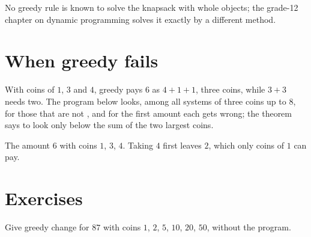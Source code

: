 No greedy rule is known to solve the knapsack with whole objects; the grade-12 chapter on dynamic programming solves it
exactly by a different method.

\section{When greedy fails}\label{sec:g11:greedy-algorithms:fails}

With coins of $1$, $3$ and $4$, greedy pays $6$ as $4 + 1 + 1$, three coins, while $3 + 3$ needs two. The program below
looks, among all systems of three coins up to $8$, for those that are not , and for the first amount each
gets wrong; the theorem says to look only below the sum of the two largest coins.

\label{lst:g11:greedy-algorithms:smallest}

\label{out:g11:greedy-algorithms:smallest}

\begin{omfigure}

{\small The amount $6$ with coins $1$, $3$, $4$. Taking $4$ first leaves $2$, which only coins of $1$ can pay.}
\end{omfigure}

\section{Exercises}\label{sec:g11:greedy-algorithms:exercises}

\begin{exercise}[$\star$]\label{exo:g11:greedy-algorithms:1}
Give greedy change for $87$ with coins $1$, $2$, $5$, $10$, $20$, $50$, without the program.
\end{exercise}


